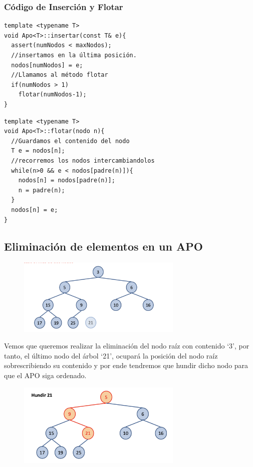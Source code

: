 \subsubsection*{Código de Inserción y Flotar}

  \begin{verbatim}
template <typename T> 
void Apo<T>::insertar(const T& e){
  assert(numNodos < maxNodos);
  //insertamos en la última posición.
  nodos[numNodos] = e; 
  //Llamamos al método flotar
  if(numNodos > 1)
    flotar(numNodos-1);
}
  \end{verbatim}
\begin{verbatim}
template <typename T>
void Apo<T>::flotar(nodo n){
  //Guardamos el contenido del nodo
  T e = nodos[n];
  //recorremos los nodos intercambiandolos
  while(n>0 && e < nodos[padre(n)]){
    nodos[n] = nodos[padre(n)];
    n = padre(n);
  }
  nodos[n] = e;
}
\end{verbatim}

\subsection*{Eliminación de elementos en un APO}
\begin{figure}[h]
  \begin{center}
    \includegraphics[width=0.7\textwidth]{assets/apo4.png}
  \end{center}
\end{figure}

Vemos que queremos realizar la eliminación del nodo raíz con contenido `3', por tanto, el último nodo del árbol `21', ocupará la posición del nodo raíz sobrescribiendo su contenido y por ende tendremos que hundir dicho nodo para que el APO siga ordenado.
\begin{figure}[h]
  \begin{center}
    \includegraphics[width=0.7\textwidth]{assets/apo5.png}
  \end{center}
\end{figure}

